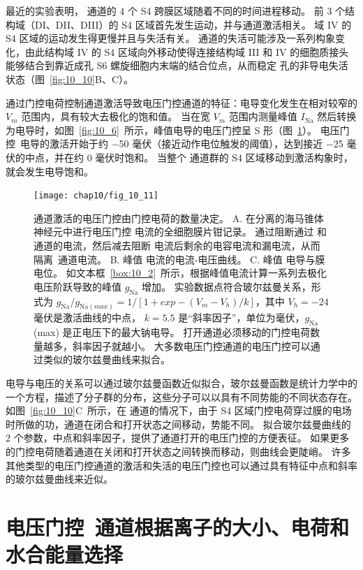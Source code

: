 最近的实验表明， 通道的 4 个 S4 跨膜区域随着不同的时间进程移动。
前 3 个结构域（DI、DII、DIII）的 S4 区域首先发生运动，并与通道激活相关。
域 IV 的 S4 区域的运动发生得更慢并且与失活有关。 
 通道的失活可能涉及一系列构象变化，由此结构域 IV 的 S4 区域向外移动使得连接结构域 III 和 IV 的细胞质接头能够结合到靠近成孔 S6 螺旋细胞内末端的结合位点，从而稳定 孔的非导电失活状态（图~\ref{fig:10_10}B、C）。


通过门控电荷控制通道激活导致电压门控通道的特征：电导变化发生在相对较窄的 $V_m$ 范围内，具有较大去极化的饱和值。
当在宽 $V_m$ 范围内测量峰值 $I_\text{Na}$ 然后转换为电导时，如图~\ref{fig:10_6}~所示，峰值电导的电压门控呈 S 形（图~\ref{fig:10_11}）。
电压门控~电导的激活开始于约 −50 毫伏（接近动作电位触发的阈值），达到接近 −25 毫伏的中点，并在约 0 毫伏时饱和。 
当整个  通道群的 S4 区域移动到激活构象时，就会发生电导饱和。


\begin{figure}[htbp]
	\centering
	\texttt{[image: chap10/fig\_10\_11]}
	\caption{通道激活的电压门控由门控电荷的数量决定。
		A. 在分离的海马锥体神经元中进行电压门控  电流的全细胞膜片钳记录。
		通过阻断通过  和通道的电流，然后减去阻断  电流后剩余的电容电流和漏电流，从而隔离~通道电流。
		B. 峰值  电流的电流-电压曲线。
		C. 峰值  电导与膜电位。 如文本框~\ref{box:10_2}~所示，根据峰值电流计算一系列去极化
		电压阶跃导致的峰值 $g_\text{Na}$ 增加。
		实验数据点符合玻尔兹曼关系，形式为 $g_\text{Na} / g_{\text{Na}(max)} = 1 / [1 + exp - (V_m - V_h) / k]$，其中 $V_h = −24$ 毫伏是激活曲线的中点， $k = 5.5$ 是“斜率因子”，单位为毫伏，$g_\text{Na}$(max) 是正电压下的最大钠电导。
		打开通道必须移动的门控电荷数量越多，斜率因子就越小。
		大多数电压门控通道的电压门控可以通过类似的玻尔兹曼曲线来拟合。}
	\label{fig:10_11}
\end{figure}


电导与电压的关系可以通过玻尔兹曼函数近似拟合，玻尔兹曼函数是统计力学中的一个方程，描述了分子群的分布，这些分子可以以具有不同势能的不同状态存在。
如图~\ref{fig:10_10}C~所示，在  通道的情况下，由于 S4 区域门控电荷穿过膜的电场时所做的功，通道在闭合和打开状态之间移动，势能不同。
拟合玻尔兹曼曲线的 2 个参数，中点和斜率因子，提供了通道打开的电压门控的方便表征。
如果更多的门控电荷随着通道在关闭和打开状态之间转换而移动，则曲线会更陡峭。
许多其他类型的电压门控通道的激活和失活的电压门控也可以通过具有特征中点和斜率的玻尔兹曼曲线来近似。


\section{电压门控~通道根据离子的大小、电荷和水合能量选择~}

